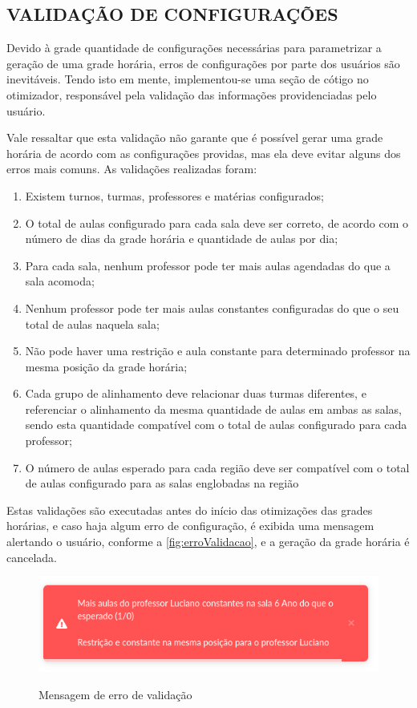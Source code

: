 \subsection{VALIDAÇÃO DE CONFIGURAÇÕES}

Devido à grade quantidade de configurações necessárias para parametrizar a geração de uma grade horária, erros de configurações por parte dos usuários são inevitáveis. Tendo isto em mente, implementou-se uma seção de cótigo no otimizador, responsável pela validação das informações providenciadas pelo usuário.

Vale ressaltar que esta validação não garante que é possível gerar uma grade horária de acordo com as configurações providas, mas ela deve evitar alguns dos erros mais comuns. As validações realizadas foram:

\begin{enumerate}
	\item Existem turnos, turmas, professores e matérias configurados;
	\item O total de aulas configurado para cada sala deve ser correto, de acordo com o número de dias da grade horária e quantidade de aulas por dia;
	\item Para cada sala, nenhum professor pode ter mais aulas agendadas do que a sala acomoda;
	\item Nenhum professor pode ter mais aulas constantes configuradas do que o seu total de aulas naquela sala;
	\item Não pode haver uma restrição e aula constante para determinado professor na mesma posição da grade horária;
	\item Cada grupo de alinhamento deve relacionar duas turmas diferentes, e referenciar o alinhamento da mesma quantidade de aulas em ambas as salas, sendo esta quantidade compatível com o total de aulas configurado para cada professor;
	\item O número de aulas esperado para cada região deve ser compatível com o total de aulas configurado para as salas englobadas na região
\end{enumerate}

Estas validações são executadas antes do início das otimizações das grades horárias, e caso haja algum erro de configuração, é exibida uma mensagem alertando o usuário, conforme a \autoref{fig:erroValidacao}, e a geração da grade horária é cancelada.

\begin{figure}[!htb]
	\centering
	\caption{Mensagem de erro de validação}
	\includegraphics[width=1\textwidth]{./dados/figuras/erroValidacao}
	\label{fig:erroValidacao}
\end{figure}
\pagebreak
